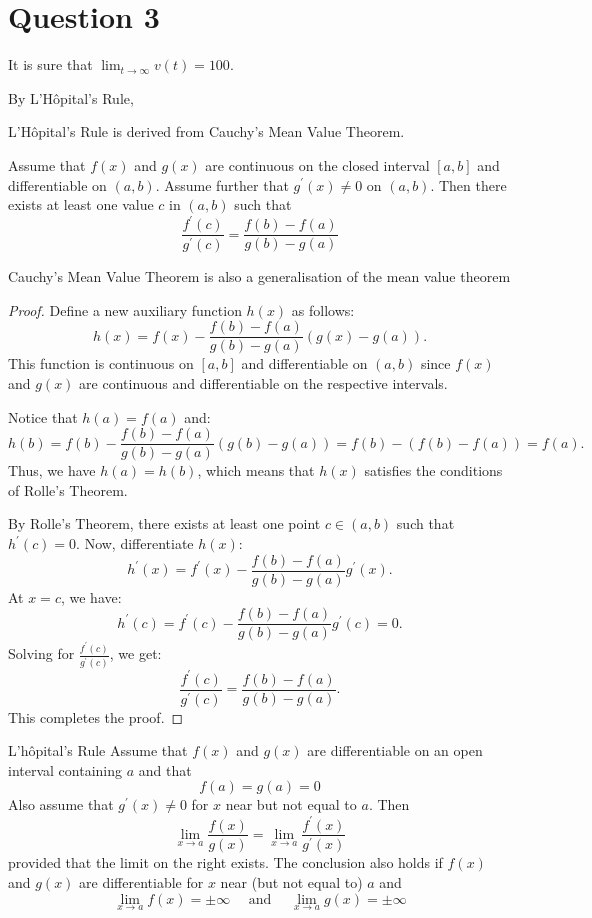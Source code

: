 \documentclass[12pt,a4paper]{article}
\begin{document}
\section*{Question 3}
It is sure that $\lim_{t \to \infty} v(t) = 100$.

By L'Hôpital's Rule,
\begin{remark}
 L'Hôpital's Rule is derived from  Cauchy’s Mean Value Theorem.
 \begin{theorem}
Assume that $f(x)$ and $g(x)$ are continuous on the closed interval $[a, b]$ and differentiable on $(a, b)$. Assume further that $g^{\prime}(x) \neq 0$ on $(a, b)$. Then there exists at least one value $c$ in $(a, b)$ such that
$$
\frac{f^{\prime}(c)}{g^{\prime}(c)}=\frac{f(b)-f(a)}{g(b)-g(a)}
$$
\end{theorem}
Cauchy's Mean Value Theorem is also a generalisation of the mean value theorem
\begin{proof}
Define a new auxiliary function \( h(x) \) as follows:
\[
h(x) = f(x) - \frac{f(b) - f(a)}{g(b) - g(a)} (g(x) - g(a)).
\]
This function is continuous on \([a, b]\) and differentiable on \((a, b)\) since \( f(x) \) and \( g(x) \) are continuous and differentiable on the respective intervals.

Notice that \( h(a) = f(a) \) and:
\[
h(b) = f(b) - \frac{f(b) - f(a)}{g(b) - g(a)} (g(b) - g(a)) = f(b) - (f(b) - f(a)) = f(a).
\]
Thus, we have \( h(a) = h(b) \), which means that \( h(x) \) satisfies the conditions of Rolle's Theorem.

By Rolle's Theorem, there exists at least one point \( c \in (a, b) \) such that \( h^{\prime}(c) = 0 \). Now, differentiate \( h(x) \):
\[
h^{\prime}(x) = f^{\prime}(x) - \frac{f(b) - f(a)}{g(b) - g(a)} g^{\prime}(x).
\]
At \( x = c \), we have:
\[
h^{\prime}(c) = f^{\prime}(c) - \frac{f(b) - f(a)}{g(b) - g(a)} g^{\prime}(c) = 0.
\]
Solving for \( \frac{f^{\prime}(c)}{g^{\prime}(c)} \), we get:
\[
\frac{f^{\prime}(c)}{g^{\prime}(c)} = \frac{f(b) - f(a)}{g(b) - g(a)}.
\]
This completes the proof.
\end{proof}

\end{remark}
\begin{theorem}
L'hôpital's Rule Assume that $f(x)$ and $g(x)$ are differentiable on an open interval containing $a$ and that
$$
f(a)=g(a)=0
$$
Also assume that $g^{\prime}(x) \neq 0$ for $x$ near but not equal to $a$. Then
$$
\lim _{x \rightarrow a} \frac{f(x)}{g(x)}=\lim _{x \rightarrow a} \frac{f^{\prime}(x)}{g^{\prime}(x)}
$$
provided that the limit on the right exists. The conclusion also holds if $f(x)$ and $g(x)$ are differentiable for $x$ near (but not equal to) $a$ and
$$
\lim _{x \rightarrow a} f(x)= \pm \infty \quad \text { and } \quad \lim _{x \rightarrow a} g(x)= \pm \infty
$$

\end{theorem}
\end{document}

